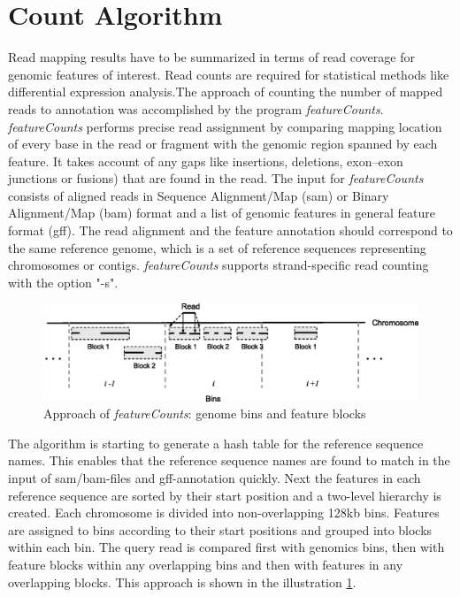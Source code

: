 \documentclass[12pt, a4paper]{report}
\begin{document}
\section{Count Algorithm}\label{featurecount}
Read mapping results have to be summarized in terms of read coverage for genomic features of interest. Read counts are required for statistical methods like differential expression analysis.The approach of counting the number of mapped reads to annotation was accomplished by the program \textit{featureCounts}. \\
\textit{featureCounts} performs precise read assignment by comparing mapping location of every base in the read or fragment with the genomic region spanned by each feature. It takes account of any gaps like insertions, deletions, exon–exon junctions or fusions) that are found in the read. 
The input for \textit{featureCounts} consists of aligned reads in Sequence Alignment/Map (sam) or Binary Alignment/Map (bam) format and a list of genomic features in general feature format (gff). The read alignment and the feature annotation should correspond to the same reference genome, which is a set of reference sequences representing chromosomes or contigs. \textit{featureCounts} supports strand-specific read counting with the option "-s". 
\begin{figure}[ht]
	\centering	
	\includegraphics[width=400pt]{pics/featurecounts}
	\caption[Approach of software \textit{featureCounts}]
	{Approach of \textit{featureCounts}: genome bins and feature blocks \cite{Liao2014} }
	\label{fig:featurecounts}
\end{figure}

The algorithm is starting to generate a hash table for the reference sequence names. This enables that the reference sequence names are found to match in the input of sam/bam-files and gff-annotation quickly. Next the features in each reference sequence are sorted by their start position and a two-level hierarchy is created. Each chromosome is divided into non-overlapping 128kb bins. Features are assigned to bins according to their start positions and grouped into blocks within each bin. The query read is compared first with genomics bins, then with feature blocks within any overlapping bins and then with features in any overlapping blocks. This approach is shown in the illustration \ref{fig:featurecounts}. \cite{Liao2014}
\end{document}
